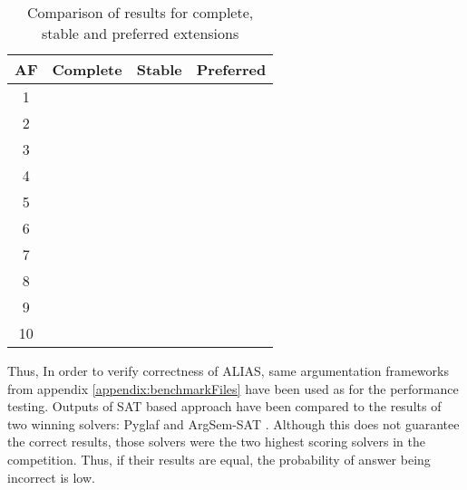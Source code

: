 \begin{table}[!h]
	\centering
	\caption{Comparison of results for complete, stable and preferred extensions}
	\label{table:prefCorrectnes}
	\begin{tabular}{|c|c|c|c|}
		AF	& Complete & Stable & Preferred \\ \hline \hline
		1 &   \cellcolor{green}\Checkmark    &   \cellcolor{green}\Checkmark     &    \cellcolor{green}\Checkmark        \\ \hline
		2 &   \cellcolor{green}\Checkmark    &   \cellcolor{green}\Checkmark     &    \cellcolor{green}\Checkmark        \\\hline
		3 &   \cellcolor{green}\Checkmark    &   \cellcolor{green}\Checkmark     &    \cellcolor{green}\Checkmark        \\\hline
		4 &   \cellcolor{green}\Checkmark    &   \cellcolor{green}\Checkmark     &    \cellcolor{green}\Checkmark        \\\hline
		5 &   \cellcolor{green}\Checkmark    &   \cellcolor{green}\Checkmark     &    \cellcolor{green}\Checkmark        \\\hline
		6 &   \cellcolor{green}\Checkmark    &   \cellcolor{green}\Checkmark     &    \cellcolor{green}\Checkmark        \\\hline
		7 &   \cellcolor{green}\Checkmark    &   \cellcolor{green}\Checkmark     &    \cellcolor{green}\Checkmark        \\\hline
		8 &   \cellcolor{green}\Checkmark    &   \cellcolor{green}\Checkmark     &    \cellcolor{green}\Checkmark        \\\hline
		9 &   \cellcolor{green}\Checkmark    &    \cellcolor{green}\Checkmark    &       \cellcolor{red}\cross     \\\hline
		10 &   \cellcolor{red}\cross    &    \cellcolor{green}\Checkmark    &       \cellcolor{green}\Checkmark \\  \hline
	\end{tabular}
\end{table}

Thus, In order to verify correctness of ALIAS, same argumentation frameworks from appendix \ref{appendix:benchmarkFiles} have been used as for the performance testing. Outputs of SAT based approach have been compared to the results of two winning solvers: Pyglaf \citep{pyglaf} and ArgSem-SAT \citep{argsemsat}. Although this does not guarantee the correct results, those solvers were the two highest scoring solvers in the competition. Thus, if their results are equal, the probability of answer being incorrect is low.

